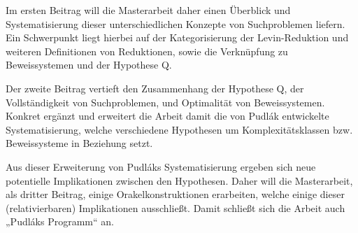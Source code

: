 \documentclass[nofonts]{uebung}
\begin{document}
Im ersten Beitrag will die Masterarbeit daher einen Überblick und Systematisierung dieser unterschiedlichen Konzepte von Suchproblemen liefern. Ein Schwerpunkt liegt hierbei auf der Kategorisierung der Levin-Reduktion und weiteren Definitionen von Reduktionen, sowie die Verknüpfung zu Beweissystemen und der Hypothese Q.

Der zweite Beitrag vertieft den Zusammenhang der Hypothese Q, der Vollständigkeit von Suchproblemen, und Optimalität von Beweissystemen. Konkret ergänzt und erweitert die Arbeit damit die von Pudlák entwickelte Systematisierung, welche verschiedene Hypothesen um Komplexitätsklassen bzw. Beweissysteme in Beziehung setzt.

Aus dieser Erweiterung von Pudláks Systematisierung ergeben sich neue potentielle Implikationen zwischen den Hypothesen. Daher will die Masterarbeit, als dritter Beitrag, einige Orakelkonstruktionen erarbeiten, welche einige dieser (relativierbaren) Implikationen ausschließt. Damit schließt sich die Arbeit auch „Pudláks Programm“ an.

\clearpage
\end{document}
